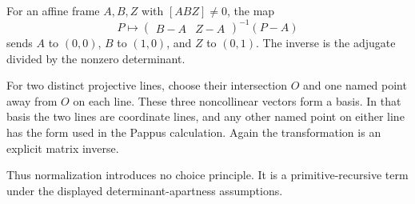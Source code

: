 For an affine frame $A,B,Z$ with $[ABZ]\ne0$, the map
\[
P\longmapsto \begin{pmatrix}B-A&Z-A\end{pmatrix}^{-1}(P-A)
\]
sends $A$ to $(0,0)$, $B$ to $(1,0)$, and $Z$ to $(0,1)$.  The inverse is the adjugate divided by the nonzero determinant.

For two distinct projective lines, choose their intersection $O$ and one named point away from $O$ on each line.  These three noncollinear vectors form a basis.  In that basis the two lines are coordinate lines, and any other named point on either line has the form used in the Pappus calculation.  Again the transformation is an explicit matrix inverse.

Thus normalization introduces no choice principle.  It is a primitive-recursive term under the displayed determinant-apartness assumptions.
